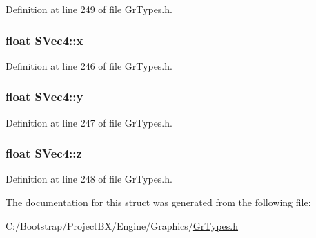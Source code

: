 Definition at line 249 of file GrTypes.h.\hypertarget{struct_s_vec4_b0b56171d97e8391eb5b139d7a97ca78}{
\subsubsection[{x}]{\setlength{\rightskip}{0pt plus 5cm}float {\bf SVec4::x}}}
\label{struct_s_vec4_b0b56171d97e8391eb5b139d7a97ca78}




Definition at line 246 of file GrTypes.h.\hypertarget{struct_s_vec4_14d72d33532154a5b90006e4bbe7d84a}{
\subsubsection[{y}]{\setlength{\rightskip}{0pt plus 5cm}float {\bf SVec4::y}}}
\label{struct_s_vec4_14d72d33532154a5b90006e4bbe7d84a}




Definition at line 247 of file GrTypes.h.\hypertarget{struct_s_vec4_2391d03d7326ea13c075cf5e8de71c4f}{
\subsubsection[{z}]{\setlength{\rightskip}{0pt plus 5cm}float {\bf SVec4::z}}}
\label{struct_s_vec4_2391d03d7326ea13c075cf5e8de71c4f}




Definition at line 248 of file GrTypes.h.

The documentation for this struct was generated from the following file:\begin{CompactItemize}
\item 
C:/Bootstrap/ProjectBX/Engine/Graphics/\hyperlink{_gr_types_8h}{GrTypes.h}\end{CompactItemize}
